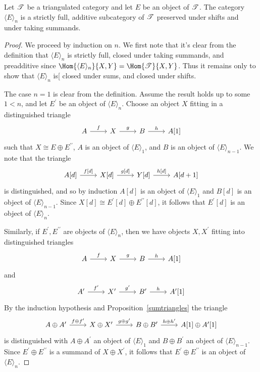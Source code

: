 \documentclass[10pt]{amsart}
\begin{document}
\begin{lem}
  Let $\mathscr{T}$ be a triangulated category and let $E$ be an object of $\mathscr{T}$.
  The category $\langle E \rangle_n$ is a strictly full, additive subcategory of $\mathscr{T}$ preserved under shifts and under taking summands.
  
  \begin{proof}
    We proceed by induction on $n$.
    We first note that it's clear from the definition that $\langle E \rangle_n$ is strictly full, closed under taking summands, and preadditive since $\Hom{\langle E \rangle_n}{X,Y} = \Hom{\T}{X,Y}$.
    Thus it remains only to show that $\langle E \rangle_n$ is[ closed under sums, and closed under shifts.
    
    The case $n = 1$ is clear from the definition.
    Assume the result holds up to some $1 < n$, and let $E^\prime$ be an object of $\langle E \rangle_n$.
    Choose an object $X$ fitting in a distinguished triangle
    $$\begin{tikzcd}
      A \arrow{r}{f} & X \arrow{r}{g} & B \arrow{r}{h} & A[1]
    \end{tikzcd}$$
    such that $X \cong E \oplus E^{\prime\prime}$, $A$ is an object of $\langle E \rangle_1$, and $B$ is an object of $\langle E \rangle_{n-1}$.
    We note that the triangle
    $$\begin{tikzcd}
      A[d] \arrow{r}{f[d]} & X[d] \arrow{r}{g[d]} & Y[d] \arrow{r}{h[d]} & A[d+1]
    \end{tikzcd}$$
    is distinguished, and so by induction $A[d]$ is an object of $\langle E \rangle_1$ and $B[d]$ is an object of $\langle E \rangle_{n-1}$.
    Since $X[d] \cong E^\prime[d] \oplus E^{\prime\prime}[d]$, it follows that $E^\prime[d]$ is an object of $\langle E \rangle_n$.
    
    Similarly, if $E^\prime, E^{\prime\prime}$ are objects of $\langle E \rangle_n$, then we have objects $X, X^\prime$ fitting into distinguished triangles
    $$\begin{tikzcd}
      A \arrow{r}{f} & X \arrow{r}{g} & B \arrow{r}{h} & A[1]
    \end{tikzcd}$$
    and
    $$\begin{tikzcd}
      A^\prime \arrow{r}{f^\prime} & X^\prime \arrow{r}{g^\prime} & B^\prime \arrow{r}{h} & A^\prime[1]
    \end{tikzcd}$$
    By the induction hypothesis and Proposition~\ref{sumtriangles} the triangle
    $$\begin{tikzcd}
      A \oplus A^\prime \arrow{r}{f \oplus f^\prime} & X \oplus X^\prime \arrow{r}{g \oplus g^\prime} & B \oplus B^\prime \arrow{r}{h \oplus h^\prime} & A[1] \oplus A^\prime[1]
    \end{tikzcd}$$
    is distinguished with $A \oplus A^\prime$ an object of $\langle E \rangle_1$ and $B \oplus B^\prime$ an object of $\langle E \rangle_{n-1}$.
    Since $E^\prime \oplus E^{\prime\prime}$ is a summand of $X \oplus X^\prime$, it follows that $E^\prime \oplus E^{\prime\prime}$ is an object of $\langle E \rangle_n$.
  \end{proof}
\end{lem}
\end{document}
